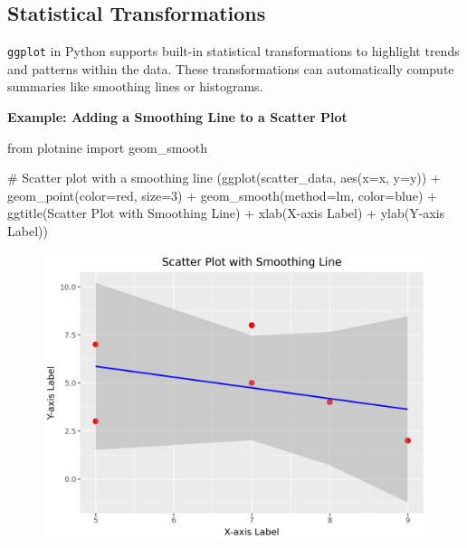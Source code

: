 \documentclass[
  letterpaper,
  DIV=11,
  numbers=noendperiod]{scrreprt}
\newenvironment{Shaded}{\begin{snugshade}}{\end{snugshade}}
\newcommand{\CommentTok}[1]{\textcolor[rgb]{0.37,0.37,0.37}{#1}}
\newcommand{\DecValTok}[1]{\textcolor[rgb]{0.68,0.00,0.00}{#1}}
\newcommand{\ImportTok}[1]{\textcolor[rgb]{0.00,0.46,0.62}{#1}}
\newcommand{\NormalTok}[1]{\textcolor[rgb]{0.00,0.23,0.31}{#1}}
\newcommand{\OperatorTok}[1]{\textcolor[rgb]{0.37,0.37,0.37}{#1}}
\newcommand{\StringTok}[1]{\textcolor[rgb]{0.13,0.47,0.30}{#1}}
\begin{document}
\hypertarget{statistical-transformations}{%
\subsection{Statistical
Transformations}\label{statistical-transformations}}

\texttt{ggplot} in Python supports built-in statistical transformations
to highlight trends and patterns within the data. These transformations
can automatically compute summaries like smoothing lines or histograms.

\textbf{Example: Adding a Smoothing Line to a Scatter Plot}

\begin{Shaded}
\begin{Highlighting}[]
\ImportTok{from}\NormalTok{ plotnine }\ImportTok{import}\NormalTok{ geom\_smooth}

\CommentTok{\# Scatter plot with a smoothing line}
\NormalTok{(ggplot(scatter\_data, aes(x}\OperatorTok{=}\StringTok{\textquotesingle{}x\textquotesingle{}}\NormalTok{, y}\OperatorTok{=}\StringTok{\textquotesingle{}y\textquotesingle{}}\NormalTok{)) }\OperatorTok{+}
\NormalTok{ geom\_point(color}\OperatorTok{=}\StringTok{\textquotesingle{}red\textquotesingle{}}\NormalTok{, size}\OperatorTok{=}\DecValTok{3}\NormalTok{) }\OperatorTok{+}
\NormalTok{ geom\_smooth(method}\OperatorTok{=}\StringTok{\textquotesingle{}lm\textquotesingle{}}\NormalTok{, color}\OperatorTok{=}\StringTok{\textquotesingle{}blue\textquotesingle{}}\NormalTok{) }\OperatorTok{+}
\NormalTok{ ggtitle(}\StringTok{\textquotesingle{}Scatter Plot with Smoothing Line\textquotesingle{}}\NormalTok{) }\OperatorTok{+}
\NormalTok{ xlab(}\StringTok{\textquotesingle{}X{-}axis Label\textquotesingle{}}\NormalTok{) }\OperatorTok{+}
\NormalTok{ ylab(}\StringTok{\textquotesingle{}Y{-}axis Label\textquotesingle{}}\NormalTok{))}
\end{Highlighting}
\end{Shaded}

\begin{figure}[H]

{\centering \includegraphics{15_Data_Vis_files/figure-pdf/cell-24-output-1.png}

}

\end{figure}
\end{document}
